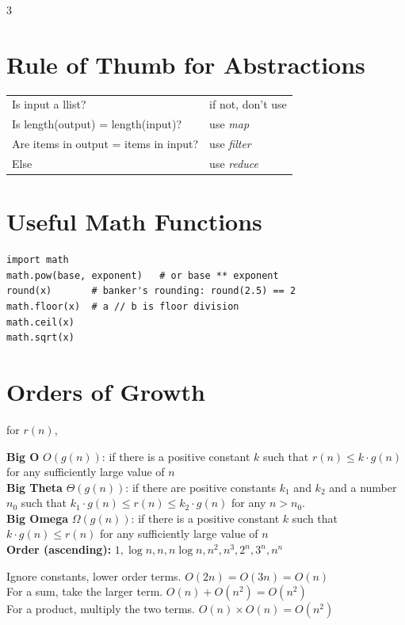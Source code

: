 \documentclass[9pt,landscape]{extarticle}
\begin{document}
\begin{multicols*}{3}
\section*{Rule of Thumb for Abstractions}
{\small
\begin{tabular}{@{}ll@{}}
Is input a llist? & if not, don't use \\
Is length(output) = length(input)? & use \emph{map} \\
Are items in output = items in input? & use \emph{filter} \\
Else & use \emph{reduce}
\end{tabular}}

\section*{Useful Math Functions}
\begin{lstlisting}
import math
math.pow(base, exponent)   # or base ** exponent
round(x)       # banker's rounding: round(2.5) == 2
math.floor(x)  # a // b is floor division
math.ceil(x)
math.sqrt(x)
\end{lstlisting}

\newpage


\section*{Orders of Growth}
for $r(n)$,

\textbf{Big O} $O(g(n))$: if there is a positive constant $k$ such that $r(n) \le k \cdot g(n)$ for any sufficiently large value of $n$\\
\textbf{Big Theta} $\Theta(g(n))$: if there are positive constants $k_1$ and $k_2$ and a number $n_0$ such that $k_1 \cdot g(n) \le r(n) \le k_2 \cdot g(n)$ for any $n > n_0$.\\
\textbf{Big Omega} $\Omega(g(n))$: if there is a positive constant $k$ such that $k \cdot g(n) \le r(n)$ for any sufficiently large value of $n$\\
\textbf{Order (ascending):} $1, \log n, n, n\log n, n^2, n^3, 2^n, 3^n, n^n$

Ignore constants, lower order terms. $O(2n) = O(3n) = O(n)$\\
For a sum, take the larger term. $O(n) + O(n^2) = O(n^2)$\\
For a product, multiply the two terms. $O(n) \times O(n) = O(n^2)$


\end{multicols*}
\end{document}
